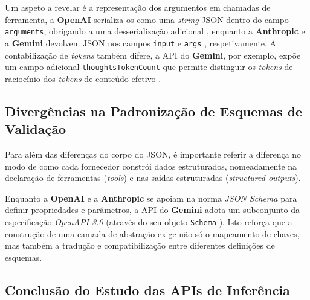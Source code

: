 Um aspeto a revelar é a representação dos argumentos em chamadas de ferramenta, a \textbf{OpenAI} serializa-os como uma \textit{string} JSON dentro do campo \texttt{arguments}, obrigando a uma desserialização adicional \cite{openai_api}, enquanto a \textbf{Anthropic} e a \textbf{Gemini} devolvem JSON nos campos \texttt{input} \cite{anthropic_api} e \texttt{args} \cite{google_gemini_api}, respetivamente. A contabilização de \textit{tokens} também difere, a API do \textbf{Gemini}, por exemplo, expõe um campo adicional \texttt{thoughtsTokenCount} que permite distinguir os \textit{tokens} de raciocínio dos \textit{tokens} de conteúdo efetivo \cite{google_gemini_api}.

\subsection{Divergências na Padronização de Esquemas de Validação}
\label{subsec:divergencias-esquemas}

Para além das diferenças do corpo do JSON, é importante referir a diferença no modo de como cada fornecedor constrói dados estruturados, nomeadamente na declaração de ferramentas (\textit{tools}) e nas saídas estruturadas (\textit{structured outputs}). 

Enquanto a \textbf{OpenAI} \cite{openai_structured_outputs} e a \textbf{Anthropic} \cite{anthropic_tool_use} se apoiam na norma \textit{JSON Schema} \cite{json_schema_spec} para definir propriedades e parâmetros, a API do \textbf{Gemini} adota um subconjunto da especificação \textit{OpenAPI 3.0} \cite{openapi_3_spec} (através do seu objeto \texttt{Schema} \cite{gemini_schema_object}). Isto reforça que a construção de uma camada de abstração exige não só o mapeamento de chaves, mas também a tradução e compatibilização entre diferentes definições de esquemas.

\subsection{Conclusão do Estudo das APIs de Inferência}

